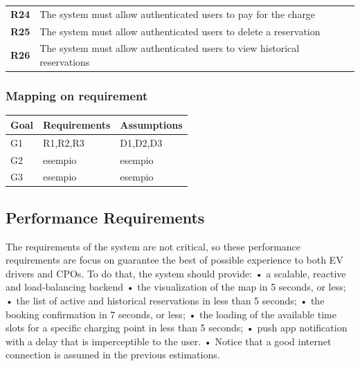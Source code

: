 \begin{table}[H]
\begin{tabularx}{\textwidth}{cX}
        \textbf{R24} & The system must allow authenticated users to pay for the charge                                                     \\
        \textbf{R25} & The system must allow authenticated users to delete a reservation                                                   \\
        \textbf{R26} & The system must allow authenticated users to view historical reservations                                           \\ \bottomrule
    \end{tabularx}
\end{table}

\subsubsection{Mapping on requirement}
\begin{table}[H]
    \begin{tabularx}{\textwidth}{XXX}
        \toprule
        \textbf{Goal} & \textbf{Requirements} & \textbf{Assumptions} \\ \midrule
        G1            & R1,R2,R3              & D1,D2,D3             \\
        G2            & esempio               & esempio              \\
        G3            & esempio               & esempio              \\ \bottomrule
    \end{tabularx}
\end{table}

\subsection{Performance Requirements}
The requirements of the system are not critical, so these performance requirements
are focus on guarantee the best of possible experience to both EV drivers and CPOs.
To do that, the system should provide:
• a scalable, reactive and load-balancing backend
• the visualization of the map in 5 seconds, or less;
• the list of active and historical reservations in less than 5 seconds;
• the booking confirmation in 7 seconds, or less;
• the loading of the available time slots for a specific charging point in less than 5 seconds;
• push app notification with a delay that is imperceptible to the user.
• Notice that a good internet connection is assumed in the previous estimations.

